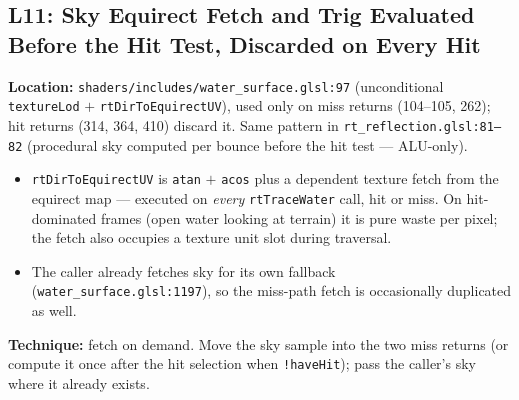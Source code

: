 \documentclass[11pt,a4paper]{article}
\begin{document}
\subsection{L11: Sky Equirect Fetch and Trig Evaluated Before the Hit Test, Discarded on Every Hit}

\textbf{Location:} \texttt{shaders/includes/water\_surface.glsl:97} (unconditional \texttt{textureLod} $+$ \texttt{rtDirToEquirectUV}), used only on miss returns (104--105, 262); hit returns (314, 364, 410) discard it. Same pattern in \texttt{rt\_reflection.glsl:81--82} (procedural sky computed per bounce before the hit test --- ALU-only).

\begin{itemize}
    \item \texttt{rtDirToEquirectUV} is \texttt{atan} $+$ \texttt{acos} plus a dependent texture fetch from the equirect map --- executed on \emph{every} \texttt{rtTraceWater} call, hit or miss. On hit-dominated frames (open water looking at terrain) it is pure waste per pixel; the fetch also occupies a texture unit slot during traversal.
    \item The caller already fetches sky for its own fallback (\texttt{water\_surface.glsl:1197}), so the miss-path fetch is occasionally duplicated as well.
\end{itemize}

\textbf{Technique:} fetch on demand. Move the sky sample into the two miss returns (or compute it once after the hit selection when \texttt{!haveHit}); pass the caller's sky where it already exists.
\end{document}
